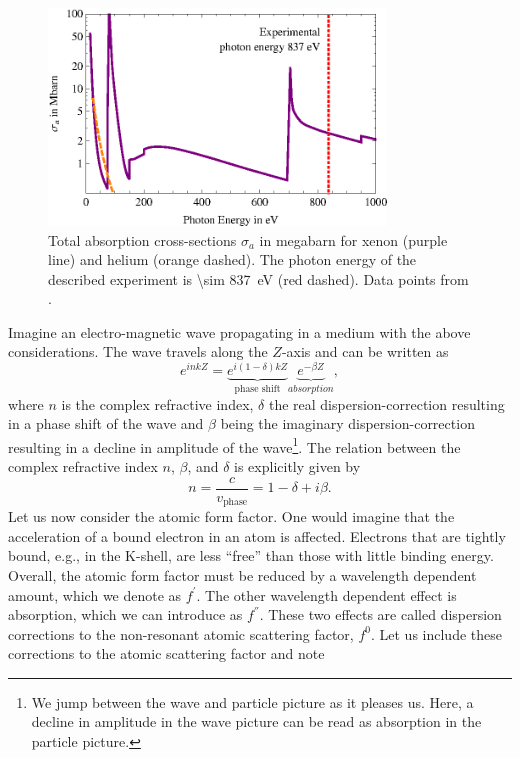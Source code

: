 \begin{figure}
	\centering
		\includegraphics[width=0.80\textwidth]{images/photoionization.eps}
	\caption[Total absorption cross-sections for helium and xenon.]{Total absorption cross-sections $\sigma_{a}$ in megabarn for xenon (purple line) and helium (orange dashed). The photon energy of the described experiment is \SI{\sim 837}{\electronvolt} (red dashed). Data points from \citep{Elettra-2016-Website,Yeh-1985-AtmDat,Yeh-1993-GBSP}.}
	\label{fig:photoionization}
\end{figure}
 Imagine an electro-magnetic wave propagating in a medium with the above considerations. The wave travels along the $Z$-axis and can be written as \citep{Als-Nielson-2011-JWS,Attwood-2007-CUP}
\begin{equation}
e^{i n k Z}= \underbrace{e^{i \left(1-\delta\right)k Z}}_{\text{phase shift}}\underbrace{e^{-\beta Z}}_{absorption},
\label{eq:wave-in-medium}
\end{equation}
where $n$ is the complex refractive index, $\delta$ the real dispersion-correction resulting in a phase shift of the wave and $\beta$ being the imaginary dispersion-correction resulting in a decline in amplitude of the wave\footnote{We jump between the wave and particle picture as it pleases us. Here, a decline in amplitude in the wave picture can be read as absorption in the particle picture.}. The relation between the complex refractive index $n$, $\beta$, and $\delta$ is explicitly given by
\begin{equation}
n=\frac{c}{v_{\text{phase}}}=1-\delta+i\beta.
\label{eq:complex-refractive-index}
\end{equation}
Let us now consider the atomic form factor. One would imagine that the acceleration of a bound electron in an atom is affected. Electrons that are tightly bound, e.g., in the K-shell, are less ``free'' than those with little binding energy. Overall, the atomic form factor must be reduced by a wavelength dependent amount, which we denote as $f^{'}$. The other wavelength dependent effect is absorption, which we can introduce as $f^{''}$. These two effects are called dispersion corrections to the non-resonant atomic scattering factor, $f^{0}$. Let us include these corrections to the atomic scattering factor and note

